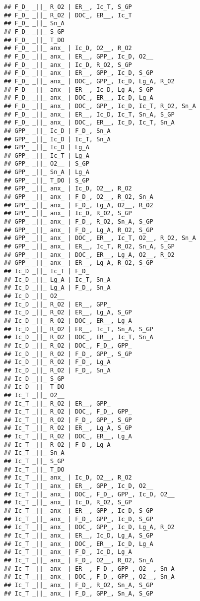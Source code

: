 \documentclass[
]{article}
\begin{document}
\begin{verbatim}
## F_D_ _||_ R_O2 | ER__, Ic_T, S_GP
## F_D_ _||_ R_O2 | DOC_, ER__, Ic_T
## F_D_ _||_ Sn_A
## F_D_ _||_ S_GP
## F_D_ _||_ T_DO
## F_D_ _||_ anx_ | Ic_D, O2__, R_O2
## F_D_ _||_ anx_ | ER__, GPP_, Ic_D, O2__
## F_D_ _||_ anx_ | Ic_D, R_O2, S_GP
## F_D_ _||_ anx_ | ER__, GPP_, Ic_D, S_GP
## F_D_ _||_ anx_ | DOC_, GPP_, Ic_D, Lg_A, R_O2
## F_D_ _||_ anx_ | ER__, Ic_D, Lg_A, S_GP
## F_D_ _||_ anx_ | DOC_, ER__, Ic_D, Lg_A
## F_D_ _||_ anx_ | DOC_, GPP_, Ic_D, Ic_T, R_O2, Sn_A
## F_D_ _||_ anx_ | ER__, Ic_D, Ic_T, Sn_A, S_GP
## F_D_ _||_ anx_ | DOC_, ER__, Ic_D, Ic_T, Sn_A
## GPP_ _||_ Ic_D | F_D_, Sn_A
## GPP_ _||_ Ic_D | Ic_T, Sn_A
## GPP_ _||_ Ic_D | Lg_A
## GPP_ _||_ Ic_T | Lg_A
## GPP_ _||_ O2__ | S_GP
## GPP_ _||_ Sn_A | Lg_A
## GPP_ _||_ T_DO | S_GP
## GPP_ _||_ anx_ | Ic_D, O2__, R_O2
## GPP_ _||_ anx_ | F_D_, O2__, R_O2, Sn_A
## GPP_ _||_ anx_ | F_D_, Lg_A, O2__, R_O2
## GPP_ _||_ anx_ | Ic_D, R_O2, S_GP
## GPP_ _||_ anx_ | F_D_, R_O2, Sn_A, S_GP
## GPP_ _||_ anx_ | F_D_, Lg_A, R_O2, S_GP
## GPP_ _||_ anx_ | DOC_, ER__, Ic_T, O2__, R_O2, Sn_A
## GPP_ _||_ anx_ | ER__, Ic_T, R_O2, Sn_A, S_GP
## GPP_ _||_ anx_ | DOC_, ER__, Lg_A, O2__, R_O2
## GPP_ _||_ anx_ | ER__, Lg_A, R_O2, S_GP
## Ic_D _||_ Ic_T | F_D_
## Ic_D _||_ Lg_A | Ic_T, Sn_A
## Ic_D _||_ Lg_A | F_D_, Sn_A
## Ic_D _||_ O2__
## Ic_D _||_ R_O2 | ER__, GPP_
## Ic_D _||_ R_O2 | ER__, Lg_A, S_GP
## Ic_D _||_ R_O2 | DOC_, ER__, Lg_A
## Ic_D _||_ R_O2 | ER__, Ic_T, Sn_A, S_GP
## Ic_D _||_ R_O2 | DOC_, ER__, Ic_T, Sn_A
## Ic_D _||_ R_O2 | DOC_, F_D_, GPP_
## Ic_D _||_ R_O2 | F_D_, GPP_, S_GP
## Ic_D _||_ R_O2 | F_D_, Lg_A
## Ic_D _||_ R_O2 | F_D_, Sn_A
## Ic_D _||_ S_GP
## Ic_D _||_ T_DO
## Ic_T _||_ O2__
## Ic_T _||_ R_O2 | ER__, GPP_
## Ic_T _||_ R_O2 | DOC_, F_D_, GPP_
## Ic_T _||_ R_O2 | F_D_, GPP_, S_GP
## Ic_T _||_ R_O2 | ER__, Lg_A, S_GP
## Ic_T _||_ R_O2 | DOC_, ER__, Lg_A
## Ic_T _||_ R_O2 | F_D_, Lg_A
## Ic_T _||_ Sn_A
## Ic_T _||_ S_GP
## Ic_T _||_ T_DO
## Ic_T _||_ anx_ | Ic_D, O2__, R_O2
## Ic_T _||_ anx_ | ER__, GPP_, Ic_D, O2__
## Ic_T _||_ anx_ | DOC_, F_D_, GPP_, Ic_D, O2__
## Ic_T _||_ anx_ | Ic_D, R_O2, S_GP
## Ic_T _||_ anx_ | ER__, GPP_, Ic_D, S_GP
## Ic_T _||_ anx_ | F_D_, GPP_, Ic_D, S_GP
## Ic_T _||_ anx_ | DOC_, GPP_, Ic_D, Lg_A, R_O2
## Ic_T _||_ anx_ | ER__, Ic_D, Lg_A, S_GP
## Ic_T _||_ anx_ | DOC_, ER__, Ic_D, Lg_A
## Ic_T _||_ anx_ | F_D_, Ic_D, Lg_A
## Ic_T _||_ anx_ | F_D_, O2__, R_O2, Sn_A
## Ic_T _||_ anx_ | ER__, F_D_, GPP_, O2__, Sn_A
## Ic_T _||_ anx_ | DOC_, F_D_, GPP_, O2__, Sn_A
## Ic_T _||_ anx_ | F_D_, R_O2, Sn_A, S_GP
## Ic_T _||_ anx_ | F_D_, GPP_, Sn_A, S_GP

\end{verbatim}
\end{document}
